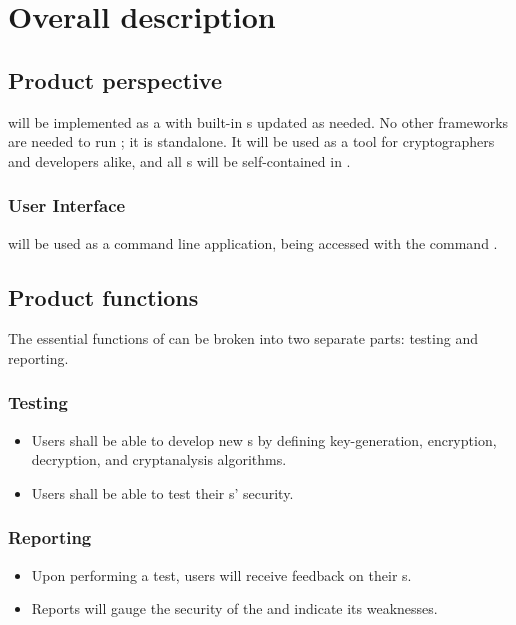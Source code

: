 \section{Overall description}
\dd


\subsection{Product perspective}

\cry{} will be implemented as a \cf{} with built-in \cs s
updated as needed. No other frameworks are needed to run
\cry; it is standalone. It will be used as a
tool for cryptographers and developers alike, and all \cs s
will be self-contained in \cry.

\subsubsection{User Interface}
\cry{} will be used as a command line application, being
accessed with the command .


\subsection{Product functions}

The essential functions of \cry{} can be broken into two
separate parts: testing and reporting.

\subsubsection{Testing}
\begin{itemize}
\item Users shall be able to develop new \cs s{}
  by defining key-generation, encryption, decryption,
  and cryptanalysis algorithms.
\item Users shall be able to test their \cs s' security.
\end{itemize}

\subsubsection{Reporting}
\begin{itemize}
\item Upon performing a test, users will receive feedback on
  their \cs s.
\item Reports will gauge the security of the
  \cs{} and indicate its weaknesses.
\end{itemize}

